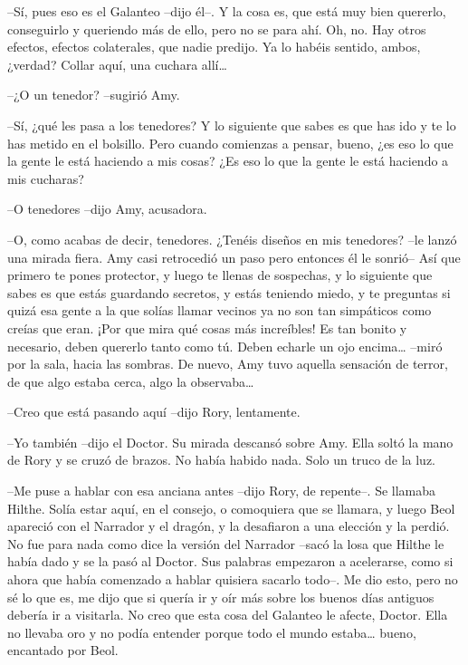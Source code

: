 {--Sí, pues eso es el Galanteo --dijo él--. Y la cosa es, que está muy
	bien quererlo, conseguirlo y queriendo más de ello, pero no se para ahí.
	Oh, no. Hay otros efectos, efectos colaterales, que nadie predijo. Ya lo
	habéis sentido, ambos, ¿verdad? Collar aquí, una cuchara allí\ldots{}}

{--¿O un tenedor? --sugirió Amy.}

{--Sí, ¿qué les pasa a los tenedores? Y lo siguiente que sabes es que
	has ido y te lo has metido en el bolsillo. Pero cuando comienzas a
	pensar, bueno, ¿es eso lo que la gente le está haciendo a mis cosas? ¿Es
eso lo que la gente le está haciendo a mis cucharas?}

{--O tenedores --dijo Amy, acusadora.}

{--O, como acabas de decir, tenedores. ¿Tenéis diseños en mis
	tenedores? --le lanzó una mirada fiera. Amy casi retrocedió un paso pero
	entonces él le sonrió-- Así que primero te pones protector, y luego te
	llenas de sospechas, y lo siguiente que sabes es que estás guardando
	secretos, y estás teniendo miedo, y te preguntas si quizá esa gente a la
	que solías llamar vecinos ya no son tan simpáticos como creías que eran.
	¡Por que mira qué cosas más increíbles! Es tan bonito y necesario, deben
	quererlo tanto como tú. Deben echarle un ojo encima\ldots{} --miró por
	la sala, hacia las sombras. De nuevo, Amy tuvo aquella sensación de
	terror, de que algo estaba cerca, algo la observaba\ldots{}}

{--Creo que está pasando aquí --dijo Rory, lentamente.}

{--Yo también --dijo el Doctor. Su mirada descansó sobre Amy. Ella
	soltó la mano de Rory y se cruzó de brazos. No había habido nada. Solo
un truco de la luz.}

{--Me puse a hablar con esa anciana antes --dijo Rory, de repente--.
	Se llamaba Hilthe. Solía estar aquí, en el consejo, o comoquiera que se
	llamara, y luego Beol apareció con el Narrador y el dragón, y la
	desafiaron a una elección y la perdió. No fue para nada como dice la
	versión del Narrador --sacó la losa que Hilthe le había dado y se la
	pasó al Doctor. Sus palabras empezaron a acelerarse, como si ahora que
	había comenzado a hablar quisiera sacarlo todo--. Me dio esto, pero no
	sé lo que es, me dijo que si quería ir y oír más sobre los buenos días
	antiguos debería ir a visitarla. No creo que esta cosa del Galanteo le
	afecte, Doctor. Ella no llevaba oro y no podía entender porque todo el
	mundo estaba\ldots{} bueno, encantado por Beol.}

